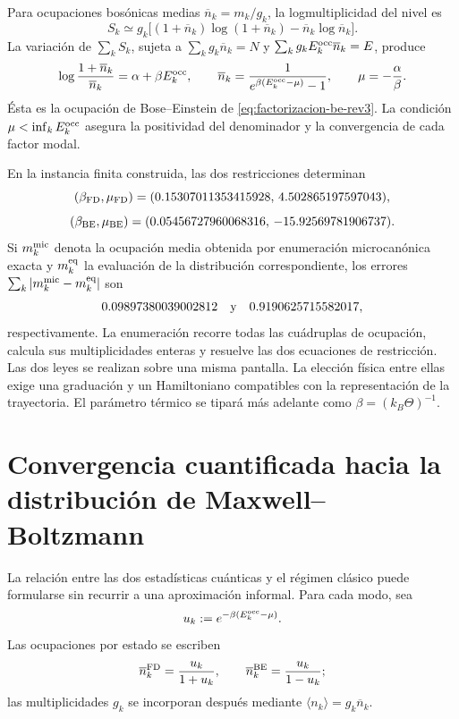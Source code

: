 Para ocupaciones bosónicas medias
\(\overline n_k=m_k/g_k\), la logmultiplicidad del nivel es
\begin{equation}
 S_k\simeq
 g_k\bigl[(1+\overline n_k)\log(1+\overline n_k)
          -\overline n_k\log\overline n_k\bigr].
 \label{eq:entropia-be-nivel-rev3}
\end{equation}
La variación de \(\sum_kS_k\), sujeta a
\(\sum_kg_k\overline n_k=N\) y
\(\sum_kg_kE_k^{\rm occ}\overline n_k=E\), produce
\begin{equation}
 \log\frac{1+\overline n_k}{\overline n_k}
 =\alpha+\beta E_k^{\rm occ},
 \qquad
 \overline n_k
 =\frac{1}{e^{\beta(E_k^{\rm occ}-\mu)}-1},
 \qquad
 \mu=-\frac{\alpha}{\beta}.
 \label{eq:variacion-be-rev3}
\end{equation}
Ésta es la ocupación de Bose--Einstein de
\eqref{eq:factorizacion-be-rev3}. La condición
\(\mu<\inf_kE_k^{\rm occ}\) asegura la positividad del denominador y la
convergencia de cada factor modal.

En la instancia finita construida, las dos restricciones determinan
\[
 (\beta_{\rm FD},\mu_{\rm FD})
 =(0.15307011353415928,\,4.502865197597043),
\]
\[
 (\beta_{\rm BE},\mu_{\rm BE})
 =(0.05456727960068316,\,-15.92569781906737).
\]
Si \(m_k^{\rm mic}\) denota la ocupación media obtenida por enumeración
microcanónica exacta y \(m_k^{\rm eq}\) la evaluación de la distribución
correspondiente, los errores
\(\sum_k|m_k^{\rm mic}-m_k^{\rm eq}|\) son
\[
 0.09897380039002812\quad\hbox{y}\quad
 0.9190625715582017,
\]
respectivamente. La enumeración recorre todas las cuádruplas de ocupación,
calcula sus multiplicidades enteras y resuelve las dos ecuaciones de
restricción. Las dos leyes se realizan sobre una misma pantalla. La elección
física entre ellas exige una graduación y un Hamiltoniano compatibles con la
representación de la trayectoria. El parámetro térmico se tipará más adelante
como \(\beta=(k_B\Theta)^{-1}\).

\section{Convergencia cuantificada hacia la distribución de Maxwell--Boltzmann}

La relación entre las dos estadísticas cuánticas y el régimen clásico puede
formularse sin recurrir a una aproximación informal. Para cada modo, sea
\[
 u_k:=e^{-\beta(E_k^{\rm occ}-\mu)}.
\]
Las ocupaciones por estado se escriben
\[
 \overline n_k^{\rm FD}=\frac{u_k}{1+u_k},
 \qquad
 \overline n_k^{\rm BE}=\frac{u_k}{1-u_k};
\]
las multiplicidades \(g_k\) se incorporan después mediante
\(\langle n_k\rangle=g_k\overline n_k\).

